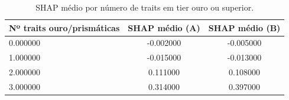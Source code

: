 \begin{table}[htbp]
\caption{SHAP médio por número de traits em tier ouro ou superior.}
\label{tab:h1mono}
\centering
\small
\begin{tabular}{lcc}
\toprule
Nº traits ouro/prismáticas & SHAP médio (A) & SHAP médio (B) \\
\midrule
0.000000 & -0.002000 & -0.005000 \\
1.000000 & -0.015000 & -0.013000 \\
2.000000 & 0.111000 & 0.108000 \\
3.000000 & 0.314000 & 0.397000 \\
\bottomrule
\end{tabular}
\end{table}
